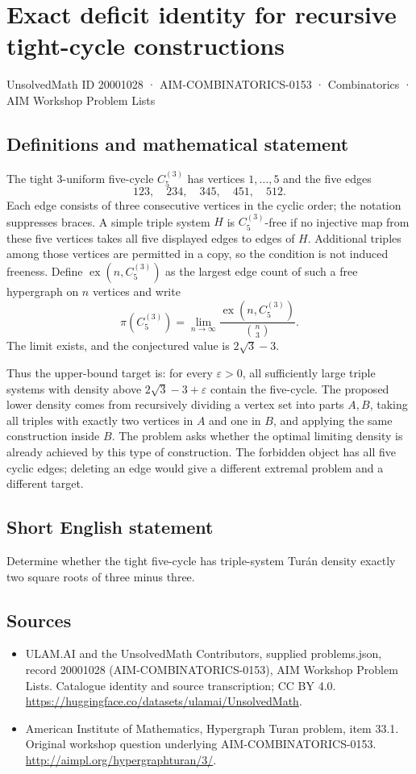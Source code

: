 \documentclass[11pt,a4paper]{article}
\begin{document}
\section*{Exact deficit identity for recursive tight-cycle constructions}\label{20001028}
{\small UnsolvedMath ID 20001028 · AIM-COMBINATORICS-0153 · Combinatorics · AIM Workshop Problem Lists}
\subsection{Definitions and mathematical statement}
The tight $3$-uniform five-cycle $C_5^{(3)}$ has vertices $1,\ldots,5$
and the five edges
\[
                 123,\quad234,\quad345,\quad451,\quad512.
\]
Each edge consists of three consecutive vertices in the cyclic order;
the notation suppresses braces. A simple triple system $H$ is
$C_5^{(3)}$-free if no injective map from these five vertices takes
all five displayed edges to edges of $H$. Additional triples among
those vertices are permitted in a copy, so the condition is not
induced freeness.
Define $\operatorname{ex}(n,C_5^{(3)})$ as the largest edge count of
such a free hypergraph on $n$ vertices and write
\[
 \pi(C_5^{(3)})=\lim_{n\to\infty}
       \frac{\operatorname{ex}(n,C_5^{(3)})}{\binom n3}.
\]
The limit exists, and the conjectured value is $2\sqrt3-3$.

Thus the upper-bound target is: for every $\varepsilon>0$, all
sufficiently large triple systems with density above
$2\sqrt3-3+\varepsilon$ contain the five-cycle. The proposed lower
density comes from recursively dividing a vertex set into parts
$A,B$, taking all triples with exactly two vertices in $A$ and one
in $B$, and applying the same construction inside $B$.
The problem asks whether the optimal limiting density is already
achieved by this type of construction. The forbidden object has all
five cyclic edges; deleting an edge would give a different extremal
problem and a different target.
\subsection{Short English statement}
Determine whether the tight five-cycle has triple-system Turán density exactly two square roots of three minus three.
\subsection{Sources}
\begin{itemize}
\item[S1] ULAM.AI and the UnsolvedMath Contributors, supplied problems.json, record 20001028 (AIM-COMBINATORICS-0153), AIM Workshop Problem Lists. Catalogue identity and source transcription; CC BY 4.0.
\url{https://huggingface.co/datasets/ulamai/UnsolvedMath}.
\item[S2] American Institute of Mathematics, Hypergraph Turan problem, item 33.1. Original workshop question underlying AIM-COMBINATORICS-0153.
\url{http://aimpl.org/hypergraphturan/3/}.
\end{itemize}
\end{document}
